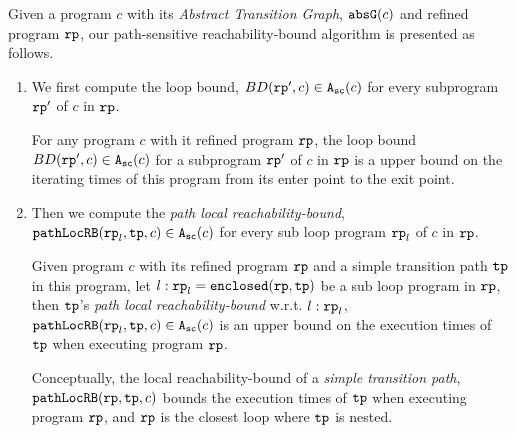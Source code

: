 Given a program $c$ with its \emph{Abstract Transition Graph}, $\mathtt{abs}{\mathtt{G}}(c)$ and refined program $\mathtt{rp}$, our path-sensitive reachability-bound algorithm is presented as follows.
\begin{enumerate}
  \item We first compute the loop bound, $BD(\mathtt{rp}', c) \in {\ensuremath{\mathtt{A_{sc}}}}(c)$ for every subprogram $\mathtt{rp}'$ of $c$ in $\mathtt{rp}$.
  \begin{defn}
    For any program $c$ with it refined program $\mathtt{rp}$,
    the loop bound $BD(\mathtt{rp}', c) \in {\ensuremath{\mathtt{A_{sc}}}}(c)$ for a subprogram $\mathtt{rp}'$ of $c$ in $\mathtt{rp}$ is a upper bound on the iterating times of this program from its enter point to the exit point.
  \end{defn}

  \item Then we compute the \emph{path local reachability-bound}, $\mathtt{pathLocRB}(\mathtt{rp}_l, \mathtt{tp}, c) \in {\ensuremath{\mathtt{A_{sc}}}}(c)$ for every sub loop program $\mathtt{rp}_l$ of $c$ in $\mathtt{rp}$.
      \begin{defn}
        Given program $c$ with its refined program $\mathtt{rp}$ and a simple transition path $\mathtt{tp}$ in this program, 
        let $l: \mathtt{rp}_l = \mathtt{enclosed}(\mathtt{rp}, \mathtt{tp})$ be a sub loop program in $\mathtt{rp}$,
        then $\mathtt{tp}$'s \emph{path local reachability-bound} w.r.t. $l: \mathtt{rp}_l$,  $\mathtt{pathLocRB}(\mathtt{rp}_l, \mathtt{tp}, c) \in {\ensuremath{\mathtt{A_{sc}}}}(c)$
       is an upper bound on the execution times of $\mathtt{tp}$ when executing program $\mathtt{rp}$.
    \end{defn}
    Conceptually, the local reachability-bound of a \emph{simple transition path},
    $\mathtt{pathLocRB}(\mathtt{rp}, \mathtt{tp}, c)$ bounds the execution times of $\mathtt{tp}$ when executing program $\mathtt{rp}$,
    and $\mathtt{rp}$ is the closest loop where $\mathtt{tp}$ is nested.


\end{enumerate}
